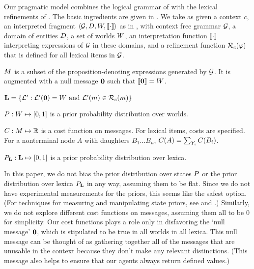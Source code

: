 \documentclass[leqno]{article}
\begin{document}
Our pragmatic model combines the logical grammar of
 with the lexical refinements of
. The basic ingredients are given in
. We take as given a context $c$, an interpreted
fragment $\langle \mathcal{G}, D, W, \llbracket\cdot\rrbracket \rangle$ as in
, with context free grammar $\mathcal{G}$, a domain
of entities $D$, a set of worlds $W$, an interpretation
function $\llbracket\cdot\rrbracket$ interpreting expressions of $\mathcal{G}$ in these
domains, and a refinement function $\mathcal{R}_{c}(\varphi)$ that is defined
for all lexical items in $\mathcal{G}$.
%
\begin{examples}
\item\label{modobjects}
  \begin{examples}
  \item\label{messages} $M$ is a subset of the
    proposition-denoting expressions generated by $\mathcal{G}$. It is
    augmented with a null message $\mathbf{0}$ such that
    $\llbracket\mathbf{0}\rrbracket = W$.

  \item\label{lexset}%
    $\mathbf{L} = \left\{ \mathcal{L}' :  \mathcal{L}'(\mathbf{0}) = W \text{ and } \mathcal{L}'(m) \in \mathcal{R}_{c}(m) \right\}$             
  
  \item $P : W \mapsto [0,1]$ is a prior probability
    distribution over worlds.

  \item $C : M \mapsto \mathbb{R}$ is a cost function on
    messages.  For lexical items, costs are specified. For a
    nonterminal node $A$ with daughters $B_{1} \ldots B_{n}$,
    $C(A) = \sum_{Y_{i}}C(B_{i})$.

  \item $P_{\mathbf{L}} : \mathbf{L} \mapsto [0,1]$ is a prior probability
    distribution over lexica.
  \end{examples}
\end{examples}

In this paper, we do not bias the prior distribution over states
$P$ or the prior distribution over lexica $P_{\mathbf{L}}$ in any
way, assuming them to be flat. Since we do not have experimental
measurements for the priors, this seems like the safest option. (For
techniques for measuring and manipulating state priors, see
\citealt{Frank:Goodman:2012} and
\citealt{Stiller:Goodman:Frank:2011}.)  Similarly, we do not explore
different cost functions on messages, assuming them all to be $0$ for
simplicity. Our cost functions plays a role only in disfavoring the
`null message' $\mathbf{0}$, which is stipulated to be true in all
worlds in all lexica. This null message can be thought of as gathering
together all of the messages that are unusable in the context because
they don't make any relevant distinctions. (This message also helps to
ensure that our agents always return defined values.)
\end{document}
